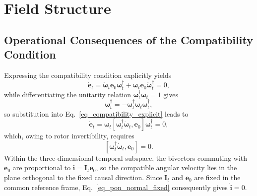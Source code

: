 
\section{Field Structure}
\subsection{Operational Consequences of the Compatibility Condition}
Expressing the compatibility condition explicitly yields
\begin{equation}\label{eq_compatibility_explicit}
    \dot{\mathbf{e}}_{t}=\dot{\boldsymbol{\omega}}_{t}\mathbf{e}_{0}\boldsymbol{\omega}_{t}^{\dagger}+\boldsymbol{\omega}_{t}\mathbf{e}_{0}\dot{\boldsymbol{\omega}}_{t}^{\dagger}=0,
\end{equation}
while differentiating the unitarity relation $\boldsymbol{\omega}_{t}^{\dagger}\boldsymbol{\omega}_{t}=1$ gives
\begin{equation}
    \dot{\boldsymbol{\omega}}_{t}^{\dagger}=-\boldsymbol{\omega}_{t}^{\dagger}\dot{\boldsymbol{\omega}}_{t}\boldsymbol{\omega}_{t}^{\dagger},
\end{equation}
so substitution into Eq.~\eqref{eq_compatibility_explicit} leads to
\begin{equation}
    \dot{\mathbf{e}}_{t}=\boldsymbol{\omega}_{t}\left[\boldsymbol{\omega}_{t}^{\dagger}\dot{\boldsymbol{\omega}}_{t},\mathbf{e}_{0}\right]\boldsymbol{\omega}_{t}^{\dagger}=0,
\end{equation}
which, owing to rotor invertibility, requires
\begin{equation}\label{eq_initial_commutator}
    \left[\boldsymbol{\omega}_{t}^{\dagger}\dot{\boldsymbol{\omega}}_{t},\mathbf{e}_{0}\right]=0.
\end{equation}
Within the three-dimensional temporal subspace, the bivectors commuting with $\mathbf{e}_{0}$ are proportional to $\mathbf{i}=\mathbf{I}_{t}\mathbf{e}_{0}$, so the compatible angular velocity lies in the plane orthogonal to the fixed causal direction. Since $\mathbf{I}_{t}$ and $\mathbf{e}_{0}$ are fixed in the common reference frame, Eq.~\eqref{eq_pon_normal_fixed} consequently gives $\dot{\mathbf{i}}=0$.

